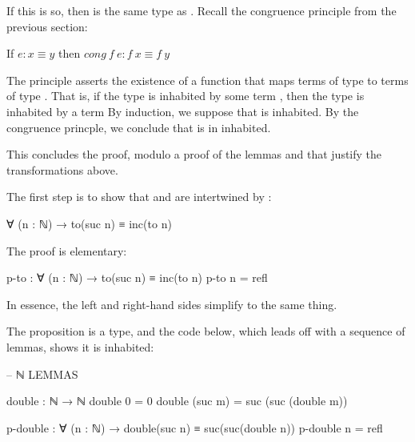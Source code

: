 If this is so, then  is the same type as .  Recall the congruence principle from the previous section:

\begin{indent}
If $e : x \equiv y$ then $cong\ f\ e: f\ x \equiv f\ y$
\end{indent}

The principle asserts the existence of a function  that maps terms of type   to terms of type .   That is, if the type   is inhabited by some term , then the type  is inhabited by a term 
By induction, we suppose that  is inhabited.  By the congruence princple, we conclude that  is in inhabited.

This concludes the proof, modulo a proof of the lemmas  and  that justify the transformations above.



\bigskip


The first step is to show that  and  are intertwined by :

\begin{colored}[elm]
∀ (n : ℕ) → to(suc n) ≡ inc(to n)

\end{colored}

The proof is elementary:

\begin{colored}[elm]
p-to : ∀ (n : ℕ) → to(suc n) ≡ inc(to n)
p-to n = refl
\end{colored}

In essence, the left and right-hand sides simplify to the same thing.

The proposition  is a type, and the code below, which leads off with a sequence of lemmas, shows it is inhabited:

\begin{colored}[elm]
-- ℕ LEMMAS

double : ℕ → ℕ
double 0 = 0
double (suc m) = suc (suc (double m))

p-double : ∀ (n : ℕ) → double(suc n) ≡ suc(suc(double n))
p-double n = refl
\end{colored}

